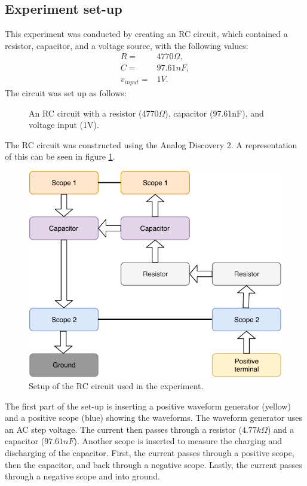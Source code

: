 \subsection{Experiment set-up}
This experiment was conducted by creating an RC circuit, which contained a resistor, capacitor, and a voltage source, with the following values:
\begin{align*}
 R =& 4770\Omega, \\
 C =& 97.61nF,
 \\
 v_{input} =& 1 V.
\end{align*}
The circuit was set up as follows:
\begin{figure}[H]
	
	\caption{An RC circuit with a resistor (4770$\Omega$), capacitor (97.61nF), and voltage input (1V).}
\end{figure}
\noindent
The RC circuit was constructed using the Analog Discovery 2. A representation of this can be seen in figure \ref{rc_flow}.
\begin{figure}[H]
	\center
		\includegraphics{fig/img/charging.pdf}
	\caption{Setup of the RC circuit used in the experiment.}
	\label{rc_flow}
\end{figure}
\noindent
The first part of the set-up is inserting a positive waveform generator (yellow) and a positive scope (blue) showing the waveforms. The waveform generator uses an AC step voltage. The current then passes through a resistor ($4.77 k\Omega$) and a capacitor ($97.61 nF$). Another scope is inserted to measure the charging and discharging of the capacitor. First, the current passes through a positive scope, then the capacitor, and back through a negative scope. Lastly, the current passes through a negative scope and into ground.
